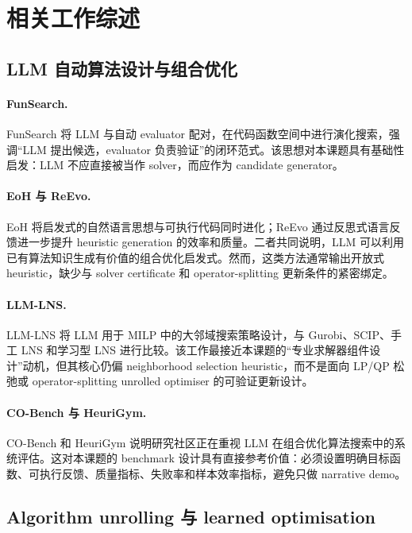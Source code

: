 \documentclass[UTF8,a4paper,12pt,fontset=fandol]{ctexart}
\begin{document}
\section{相关工作综述}

\subsection{LLM 自动算法设计与组合优化}

\paragraph{FunSearch.}
FunSearch 将 LLM 与自动 evaluator 配对，在代码函数空间中进行演化搜索，强调“LLM 提出候选，evaluator 负责验证”的闭环范式。该思想对本课题具有基础性启发：LLM 不应直接被当作 solver，而应作为 candidate generator。

\paragraph{EoH 与 ReEvo.}
EoH 将启发式的自然语言思想与可执行代码同时进化；ReEvo 通过反思式语言反馈进一步提升 heuristic generation 的效率和质量。二者共同说明，LLM 可以利用已有算法知识生成有价值的组合优化启发式。然而，这类方法通常输出开放式 heuristic，缺少与 solver certificate 和 operator-splitting 更新条件的紧密绑定。

\paragraph{LLM-LNS.}
LLM-LNS 将 LLM 用于 MILP 中的大邻域搜索策略设计，与 Gurobi、SCIP、手工 LNS 和学习型 LNS 进行比较。该工作最接近本课题的“专业求解器组件设计”动机，但其核心仍偏 neighborhood selection heuristic，而不是面向 LP/QP 松弛或 operator-splitting unrolled optimiser 的可验证更新设计。

\paragraph{CO-Bench 与 HeuriGym.}
CO-Bench 和 HeuriGym 说明研究社区正在重视 LLM 在组合优化算法搜索中的系统评估。这对本课题的 benchmark 设计具有直接参考价值：必须设置明确目标函数、可执行反馈、质量指标、失败率和样本效率指标，避免只做 narrative demo。

\subsection{Algorithm unrolling 与 learned optimisation}
\end{document}
